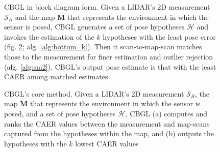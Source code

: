 \begin{figure}[]\centering
  
  \caption{\small CBGL in block diagram form. Given a LIDAR's 2D measurement
           $\mathcal{S}_R$ and the map $\bm{M}$ that represents the environment
           in which the sensor is posed, CBGL generates a set of pose hypotheses
           $\mathcal{H}$ and invokes the estimation of the $k$ hypotheses with
           the least pose error (fig. \ref{fig:bottom_k}; alg.
           \ref{alg:bottom_k}). Then it scan-to-map-scan matches those to the
           measurement for finer estimation and outlier rejection (alg.
           \ref{alg:sm2}). CBGL's output pose estimate is that with the least
           CAER among matched estimates}
  \label{fig:cbgl}
\end{figure}

\begin{figure}[]\centering
  
  \caption{\small CBGL's core method. Given a LIDAR's 2D measurement
           $\mathcal{S}_R$, the map $\bm{M}$ that represents the environment in
           which the sensor is posed, and a set of pose hypotheses
           $\mathcal{H}$, CBGL (a) computes and ranks the CAER values between
           the measurement and map-scans captured from the hypotheses within
           the map, and (b) outputs the hypotheses with the $k$ lowest CAER
           values}
  \label{fig:bottom_k}
\end{figure}


